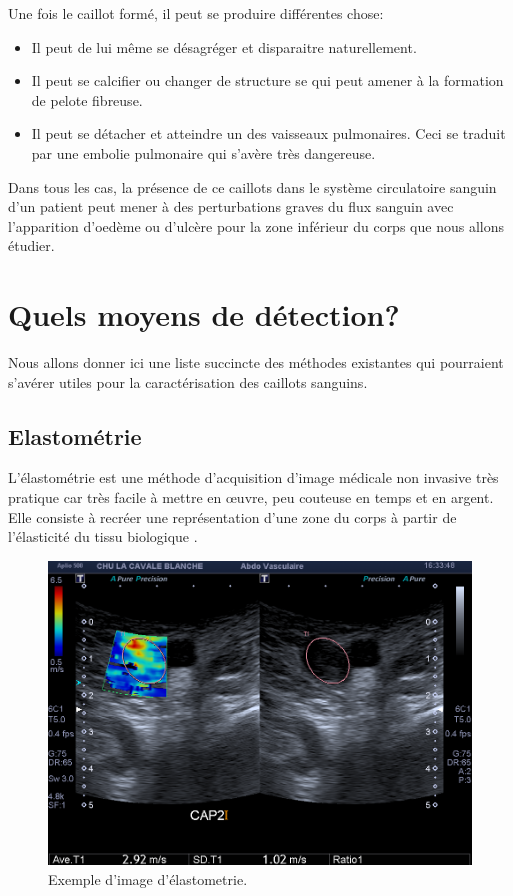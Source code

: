 Une fois le caillot formé, il peut se produire différentes chose:

\begin{itemize}
\item Il peut de lui même se désagréger et disparaitre naturellement.
\item Il peut se calcifier ou changer de structure se qui peut amener à la formation de pelote fibreuse.
\item Il peut se détacher et atteindre un des vaisseaux pulmonaires. Ceci se traduit par une embolie pulmonaire qui s'avère très dangereuse.
\end{itemize}

Dans tous les cas, la présence de ce caillots dans le système circulatoire sanguin d'un patient peut mener à des perturbations graves du flux sanguin avec l'apparition d'oedème ou d'ulcère pour la zone inférieur du corps que nous allons étudier.


\chapter{Quels moyens de détection?}

Nous allons donner ici une liste succincte des méthodes existantes qui pourraient s'avérer utiles pour la caractérisation des caillots sanguins.

\section{Elastométrie}

L'élastométrie est une méthode d'acquisition d'image médicale non invasive très pratique car très facile à mettre en œuvre, peu couteuse en temps et en argent. Elle consiste à recréer une représentation d'une zone du corps à partir de l'élasticité du tissu biologique \cite{ophir1991elastography}.

\begin{figure}[H]
\centering
    \includegraphics[scale=0.3,angle=0]{Images/ExempleElastometrie.png}
    \caption{Exemple d'image d'élastometrie.}
    \label{fig:ExempleElastometrie}
\end{figure}

